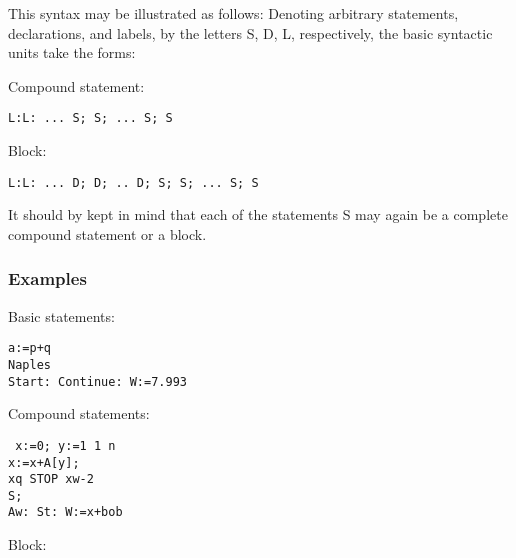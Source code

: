 \documentclass[a4paper,11pt]{article}
\begin{document}
This syntax may be illustrated as follows: Denoting arbitrary
statements, declarations, and labels, by the letters S, D, L,
respectively, the basic syntactic units take the forms:

Compound statement:
\begin{flushleft}
\texttt{L:L: ...  S; S; ... S; S }
\end{flushleft}

Block:
\begin{flushleft}
\texttt{L:L: ...  D; D; .. D; S; S; ... S; S }
\end{flushleft}

It should by kept in mind that each of the statements S may again be a
complete compound statement or a block.


\subsubsection{Examples}

Basic statements:

\begin{flushleft}
\texttt{a:=p+q\\
 Naples\\
Start: Continue: W:=7.993}\\
\end{flushleft}

Compound statements:

\begin{flushleft}
\texttt{ x:=0;  y:=1  1  n \\
  \hspace{2.0cm}x:=x+A[y];\\
  \hspace{1.25cm} x\mgt{}q   STOP   x\mgt{}w-2 \\
  \hspace{2.0cm} S;\\
  \hspace{1.25cm}Aw: St: W:=x+bob }\\
\end{flushleft}

Block:
\end{document}
